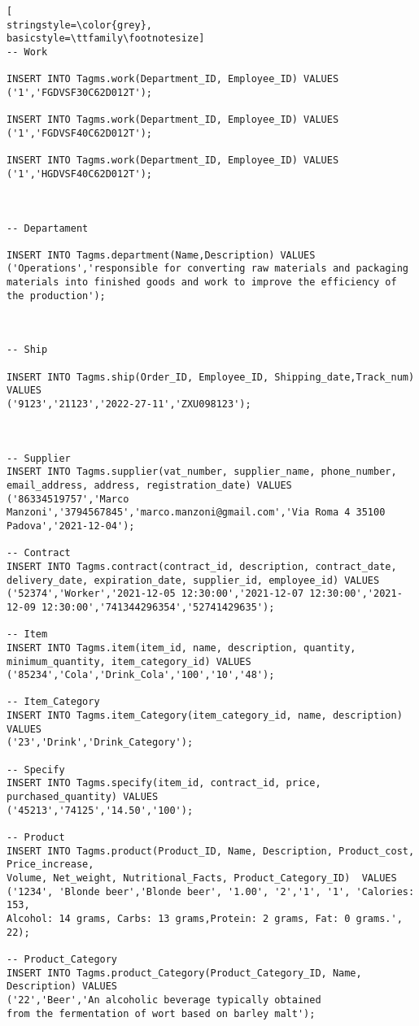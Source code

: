 \begin{lstlisting}[
stringstyle=\color{grey},
basicstyle=\ttfamily\footnotesize]
-- Work

INSERT INTO Tagms.work(Department_ID, Employee_ID) VALUES 
('1','FGDVSF30C62D012T');

INSERT INTO Tagms.work(Department_ID, Employee_ID) VALUES 
('1','FGDVSF40C62D012T');

INSERT INTO Tagms.work(Department_ID, Employee_ID) VALUES 
('1','HGDVSF40C62D012T');



-- Departament

INSERT INTO Tagms.department(Name,Description) VALUES
('Operations','responsible for converting raw materials and packaging materials into finished goods and work to improve the efficiency of the production');



-- Ship

INSERT INTO Tagms.ship(Order_ID, Employee_ID, Shipping_date,Track_num) VALUES 
('9123','21123','2022-27-11','ZXU098123');



-- Supplier
INSERT INTO Tagms.supplier(vat_number, supplier_name, phone_number, email_address, address, registration_date) VALUES
('86334519757','Marco Manzoni','3794567845','marco.manzoni@gmail.com','Via Roma 4 35100 Padova','2021-12-04');

-- Contract
INSERT INTO Tagms.contract(contract_id, description, contract_date, delivery_date, expiration_date, supplier_id, employee_id) VALUES 
('52374','Worker','2021-12-05 12:30:00','2021-12-07 12:30:00','2021-12-09 12:30:00','741344296354','52741429635');

-- Item
INSERT INTO Tagms.item(item_id, name, description, quantity, minimum_quantity, item_category_id) VALUES 
('85234','Cola','Drink_Cola','100','10','48');

-- Item_Category
INSERT INTO Tagms.item_Category(item_category_id, name, description) VALUES
('23','Drink','Drink_Category');

-- Specify
INSERT INTO Tagms.specify(item_id, contract_id, price, purchased_quantity) VALUES
('45213','74125','14.50','100');

-- Product
INSERT INTO Tagms.product(Product_ID, Name, Description, Product_cost, Price_increase,
Volume, Net_weight, Nutritional_Facts, Product_Category_ID)  VALUES 
('1234', 'Blonde beer','Blonde beer', '1.00', '2','1', '1', 'Calories: 153, 
Alcohol: 14 grams, Carbs: 13 grams,Protein: 2 grams, Fat: 0 grams.', 22);

-- Product_Category
INSERT INTO Tagms.product_Category(Product_Category_ID, Name, Description) VALUES 
('22','Beer','An alcoholic beverage typically obtained 
from the fermentation of wort based on barley malt');


\end{lstlisting}
